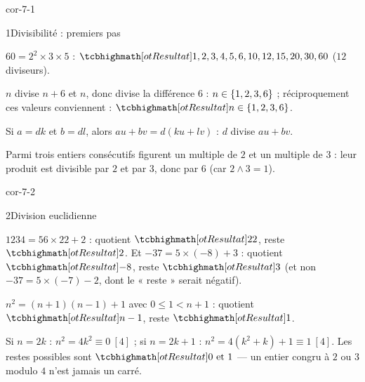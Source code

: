 
\corrigesSouples

\begin{blocLivre}{cor-7-1}
\begin{corrige}{1}{Divisibilité : premiers pas}
\begin{questions}
  \item $60=2^{2}\times3\times5$ :
    $\res{1,2,3,4,5,6,10,12,15,20,30,60}$ ($12$ diviseurs).
  \item $n$ divise $n+6$ et $n$, donc divise la différence $6$ :
    $n\in\left\{1,2,3,6\right\}$ ; réciproquement ces valeurs conviennent :
    $\res{n\in\ens{1,2,3,6}}$.
  \item Si $a=dk$ et $b=dl$, alors $au+bv=d(ku+lv)$ : $d$ divise $au+bv$.
  \item Parmi trois entiers consécutifs figurent un multiple de $2$ et un
    multiple de $3$ : leur produit est divisible par $2$ et par $3$, donc
    par $6$ (car $2\wedge3=1$).
\end{questions}
\end{corrige}
\end{blocLivre}

\begin{blocLivre}{cor-7-2}
\begin{corrige}{2}{Division euclidienne}
\demarche{Le reste appartient à $[0\,;b[$ — surtout pour un dividende négatif.}
\begin{questions}
  \item $1234=56\times22+2$ : quotient $\res{22}$, reste $\res{2}$.
    Et $-37=5\times(-8)+3$ : quotient $\res{-8}$, reste $\res{3}$
    (et non $-37=5\times(-7)-2$, dont le « reste » serait négatif).
  \item $n^{2}=(n+1)(n-1)+1$ avec $0\leq1<n+1$ : quotient $\res{n-1}$,
    reste $\res{1}$.
  \item Si $n=2k$ : $n^{2}=4k^{2}\equiv0\ [4]$ ; si $n=2k+1$ :
    $n^{2}=4(k^{2}+k)+1\equiv1\ [4]$. Les restes possibles sont
    $\res{0\text{ et }1}$ — un entier congru à $2$ ou $3$ modulo $4$ n'est
    jamais un carré.
\end{questions}
\end{corrige}
\end{blocLivre}

